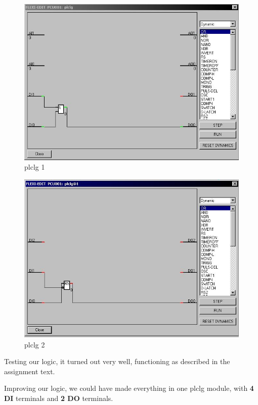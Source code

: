 \begin{figure}[!htb]
    \centering
    \centerline{\includegraphics[width=1.1\textwidth]{images/bilde3}}
    \caption{plclg 1}
    \end{figure}
    
\begin{figure}[!htb]
    \centering
    \centerline{\includegraphics[width=1.5\textwidth]{images/bilde2}}
    \caption{plclg 2}
    \end{figure}

\newpage
Testing our logic, it turned out very well, functioning as described in the assignment text. 
    
Improving our logic, we could have made everything in one plclg module, with \textbf{4 DI} terminals and \textbf{2 DO} terminals.

